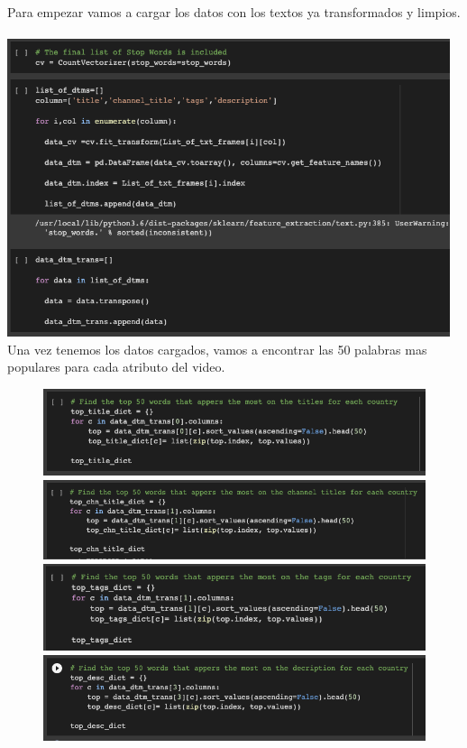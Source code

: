 \documentclass[a4paper,12pt]{article}
\begin{document}
Para empezar vamos a cargar los datos con los textos ya transformados y limpios.
\\
\\
\includegraphics[width=13cm]{50_words_1.png}
\\

Una vez tenemos los datos cargados, vamos a encontrar las 50 palabras mas populares para cada atributo del video.

\begin{figure}[h!]
\centering
\includegraphics[width=12cm]{50_words_title.png}
\includegraphics[width=12cm]{50_words_channel.png}
\includegraphics[width=12cm]{50_words_tags.png}
\includegraphics[width=12cm]{50_words_desc.png}
\end{figure}
\end{document}
